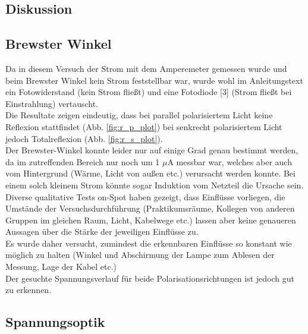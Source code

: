 \documentclass[12pt,a4paper]{article}
\begin{document}
\begin{multicols}{2}
\section{Diskussion}

\subsection{Brewster Winkel}
Da in diesem Versuch der Strom mit dem Amperemeter gemessen wurde und beim Brewster Winkel kein Strom feststellbar war, wurde wohl im Anleitungstext ein Fotowiderstand (kein Strom fließt) und eine Fotodiode [3] (Strom fließt bei Einstrahlung) vertauscht. \\
Die Resultate zeigen eindeutig, dass bei parallel polarisiertem Licht keine Reflexion stattfindet  (Abb. \ref{fig:r_p_plot}) bei senkrecht polarisiertem Licht jedoch Totalreflexion (Abb. \ref{fig:r_s_plot}). \\
Der Brewster-Winkel konnte leider nur auf einige Grad genau bestimmt werden, da im zutreffenden Bereich nur noch um 1 $\mu$A messbar war, welches aber auch vom Hintergrund (Wärme, Licht von außen etc.) verursacht werden konnte. Bei einem solch kleinem Strom könnte sogar Induktion vom Netzteil die Ursache sein.\\

\noindent Diverse qualitative Tests on-Spot haben gezeigt, dass Einflüsse vorliegen, die Umstände der Versuchsdurchführung (Praktikumsräume, Kollegen von anderen Gruppen im gleichen Raum, Licht, Kabelwege etc.) lassen aber keine genaueren Aussagen über die Stärke der jeweiligen Einflüsse zu.\\
Es wurde daher versucht, zumindest die erkennbaren Einflüsse so konstant wie möglich zu halten (Winkel und Abschirmung der Lampe zum Ablesen der Messung, Lage der Kabel etc.)\\
Der gesuchte Spannungsverlauf für beide Polarisationsrichtungen ist jedoch gut zu erkennen.

\subsection{Spannungsoptik}


\end{multicols}
\end{document}
